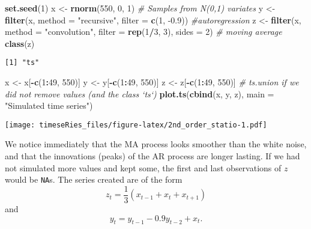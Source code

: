 \documentclass[]{book}
\newenvironment{Shaded}{\begin{snugshade}}{\end{snugshade}}
\newcommand{\CommentTok}[1]{\textcolor[rgb]{0.56,0.35,0.01}{\textit{#1}}}
\newcommand{\DataTypeTok}[1]{\textcolor[rgb]{0.13,0.29,0.53}{#1}}
\newcommand{\DecValTok}[1]{\textcolor[rgb]{0.00,0.00,0.81}{#1}}
\newcommand{\FloatTok}[1]{\textcolor[rgb]{0.00,0.00,0.81}{#1}}
\newcommand{\KeywordTok}[1]{\textcolor[rgb]{0.13,0.29,0.53}{\textbf{#1}}}
\newcommand{\NormalTok}[1]{#1}
\newcommand{\OperatorTok}[1]{\textcolor[rgb]{0.81,0.36,0.00}{\textbf{#1}}}
\newcommand{\StringTok}[1]{\textcolor[rgb]{0.31,0.60,0.02}{#1}}
\begin{document}
\begin{Shaded}
\begin{Highlighting}[]
\KeywordTok{set.seed}\NormalTok{(}\DecValTok{1}\NormalTok{)}
\NormalTok{x <-}\StringTok{ }\KeywordTok{rnorm}\NormalTok{(}\DecValTok{550}\NormalTok{, }\DecValTok{0}\NormalTok{, }\DecValTok{1}\NormalTok{)  }\CommentTok{# Samples from N(0,1) variates}
\NormalTok{y <-}\StringTok{ }\KeywordTok{filter}\NormalTok{(x, }\DataTypeTok{method =} \StringTok{"recursive"}\NormalTok{, }\DataTypeTok{filter =} \KeywordTok{c}\NormalTok{(}\DecValTok{1}\NormalTok{, }\FloatTok{-0.9}\NormalTok{))  }\CommentTok{#autoregression}
\NormalTok{z <-}\StringTok{ }\KeywordTok{filter}\NormalTok{(x, }\DataTypeTok{method =} \StringTok{"convolution"}\NormalTok{, }\DataTypeTok{filter =} \KeywordTok{rep}\NormalTok{(}\DecValTok{1}\OperatorTok{/}\DecValTok{3}\NormalTok{, }\DecValTok{3}\NormalTok{), }\DataTypeTok{sides =} \DecValTok{2}\NormalTok{)  }\CommentTok{# moving average}
\KeywordTok{class}\NormalTok{(z)}
\end{Highlighting}
\end{Shaded}

\begin{verbatim}
[1] "ts"
\end{verbatim}

\begin{Shaded}
\begin{Highlighting}[]
\NormalTok{x <-}\StringTok{ }\NormalTok{x[}\OperatorTok{-}\KeywordTok{c}\NormalTok{(}\DecValTok{1}\OperatorTok{:}\DecValTok{49}\NormalTok{, }\DecValTok{550}\NormalTok{)]}
\NormalTok{y <-}\StringTok{ }\NormalTok{y[}\OperatorTok{-}\KeywordTok{c}\NormalTok{(}\DecValTok{1}\OperatorTok{:}\DecValTok{49}\NormalTok{, }\DecValTok{550}\NormalTok{)]}
\NormalTok{z <-}\StringTok{ }\NormalTok{z[}\OperatorTok{-}\KeywordTok{c}\NormalTok{(}\DecValTok{1}\OperatorTok{:}\DecValTok{49}\NormalTok{, }\DecValTok{550}\NormalTok{)]}
\CommentTok{# ts.union if we did not remove values (and the class `ts`)}
\KeywordTok{plot.ts}\NormalTok{(}\KeywordTok{cbind}\NormalTok{(x, y, z), }\DataTypeTok{main =} \StringTok{"Simulated time series"}\NormalTok{)}
\end{Highlighting}
\end{Shaded}

\texttt{[image: timeseRies\_files/figure-latex/2nd\_order\_statio-1.pdf]}

We notice immediately that the MA process looks smoother than the white
noise, and that the innovations (peaks) of the AR process are longer
lasting. If we had not simulated more values and kept some, the first
and last observations of \(z\) would be \texttt{NA}s. The series created
are of the form \[ z_t=\frac{1}{3}(x_{t-1}+x_{t}+x_{t+1})\] and
\[ y_t= y_{t-1}-0.9y_{t-2}+x_t.\]
\end{document}
